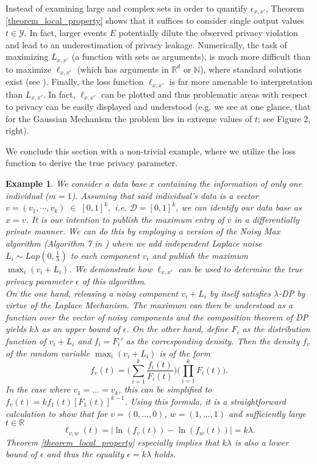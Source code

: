 \documentclass[conference]{IEEEtran}
\newtheorem{example}{Example}
\begin{document}
Instead of examining large and complex sets in order to quantify $\epsilon_{x,x'}$, Theorem \ref{theorem_local_property} shows that it suffices to consider single output values $t \in \mathcal{Y}$. In fact, larger events $E$ potentially dilute the observed privacy violation and lead to an underestimation of privacy leakage.
Numerically, the task of maximizing  $L_{x,x'}$ (a function with sets as arguments), is much more difficult than to maximize $\ell_{x,x'}$ (which has arguments in $\mathbb{R}^d$ or $\mathbb{N}$), where standard solutions exist (see \cite{forst2010}). 
Finally, the loss function $\ell_{x,x'} $ is far more amenable to interpretation than $L_{x,x'}$. In fact, $\ell_{x,x'}$ can be plotted and thus problematic areas with respect to privacy can be easily displayed and understood (e.g. we see at one glance, that for the Gaussian Mechanism the problem lies in extreme values of $t$; see Figure 2, right).

We conclude this section with a non-trivial example, where we utilize the loss function to derive the true privacy parameter.


\begin{example} \label{example_1} We consider a data base $x$ containing the information of only one individual ($m = 1$). Assuming that said individual's data is a vector $
    v = (v_1, \cdots, v_k) \; \in \; [0,1]^k,
$ i.e. $\mathcal{D} = [0,1]^k$, we can identify our data base as $x = v$. It is our intention to publish the maximum entry of $v$ in a differentially private manner. We can do this by employing a version of the \textit{Noisy Max} algorithm (Algorithm 7 in \cite{StatDP}) where we add independent Laplace noise $L_i \sim Lap(0, \frac{1}{\lambda})$ to each component $v_i$ and publish the maximum $\max_i (v_i+L_i)$. We demonstrate how $\ell_{x,x'}$ can be used to determine the true privacy parameter $\epsilon$ of this algorithm. \\
On the one hand, releasing a noisy component $v_i + L_i$ by itself satisfies $\lambda$-DP by virtue of the Laplace Mechanism. The maximum can then be understood as a function over the vector of noisy components and the composition theorem of DP yields $ k \lambda$ as an upper bound of $\epsilon$. 
On the other hand, define $F_i$ as the distribution function of $v_i+L_i$ and $f_i = F_i'$ as the corresponding density. Then the density $f_v$ of the random variable $\max_i (v_i+L_i)$ is of the form
$$
f_v(t) = \Big(\sum_{i=1}^k \frac{f_i(t)}{F_i(t)}\Big) \Big( \prod_{i=1}^k F_i(t) \Big).
$$
In the case where $v_1=...=v_k$, this can be simplified to $f_v(t)= k f_1(t) [F_1(t)]^{k-1}$. Using this formula, it is a straightforward calculation to show that for $v=(0,...,0)$, $w=(1,...,1)$ and  sufficiently large $t \in \mathbb{R}$
$$
 \ell_{v,w}(t) = |\ln(f_v(t))-\ln(f_w(t))| = k \lambda.
$$
Theorem \ref{theorem_local_property}  especially implies that $k \lambda$ is also a lower bound of $\epsilon$ and thus the equality $\epsilon = k \lambda $ holds.
\end{example}
\end{document}
